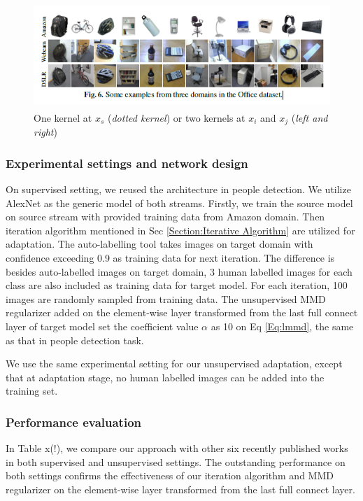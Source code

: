 \documentclass[runningheads]{llncs}
\begin{document}
\begin{figure}
\centering
\includegraphics[height=4cm]{images/officeimages.png}
\caption{One kernel at $x_s$ ({\it dotted kernel}) or two kernels at
$x_i$ and $x_j$ ({\it left and right}) }
\label{fig:example}
\end{figure}

\subsubsection{Experimental settings and network design}
On supervised setting, we reused the architecture in people detection. We utilize AlexNet \cite{krizhevsky2012imagenet} as the generic model of both streams. Firstly, we train the source model on source stream with provided training data from Amazon domain. Then iteration algorithm mentioned in Sec \ref{Section:Iterative Algorithm} are utilized for adaptation. The auto-labelling tool takes images on target domain with confidence exceeding 0.9 as training data for next iteration. The difference is besides auto-labelled images on target domain, 3 human labelled images for each class are also included as training data for target model. For each iteration, 100 images are randomly sampled from training data. The unsupervised MMD regularizer added on the element-wise layer transformed from the last full connect layer of target model set the coefficient value $\alpha$ as 10 on Eq \ref{Eq:lmmd}, the same as that in people detection task.

We use the same experimental setting for our unsupervised adaptation, except that at adaptation stage, no human labelled images can be added into the training set.
\subsubsection{Performance evaluation}
In Table x(!), we compare our approach with other six recently published works in both supervised and unsupervised settings. The outstanding performance on both settings confirms the effectiveness of our iteration algorithm and MMD regularizer on the element-wise layer transformed from the last full connect layer.
\end{document}
